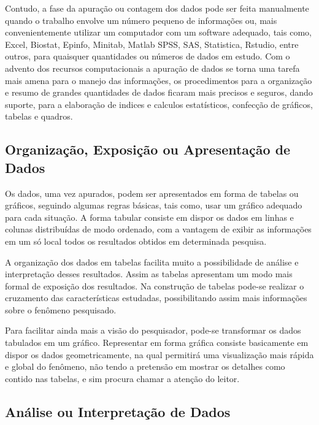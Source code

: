 Contudo, a fase da apuração ou contagem dos dados pode ser feita manualmente quando o trabalho envolve um número pequeno de
informações ou, mais convenientemente utilizar um computador com
um software adequado, tais como, Excel, Biostat, Epinfo, Minitab, Matlab
SPSS, SAS, Statistica, Rstudio, entre outros, para quaisquer quantidades ou números de
dados em estudo. Com o advento dos recursos computacionais a
apuração de dados se torna uma tarefa mais amena para o manejo das
informações, os procedimentos para a organização e resumo de
grandes quantidades de dados ficaram mais precisos e seguros,
dando suporte, para a elaboração de indices e calculos
estatísticos, confecção de gráficos, tabelas e quadros.



\subsection{Organização, Exposição ou Apresentação de Dados}

\inic Os dados, uma vez apurados, podem ser apresentados em forma
de tabelas ou gráficos, seguindo algumas regras básicas,
tais como, usar um gráfico adequado para cada situação. A forma
tabular consiste em dispor os dados em linhas e colunas
distribuídas de modo ordenado, com a vantagem de exibir as
informações em um só local todos os resultados obtidos em
determinada pesquisa. 

\newpage
A organização dos dados em tabelas facilita
muito a possibilidade de análise e interpretação desses
resultados. Assim as tabelas apresentam um modo mais formal de
exposição dos resultados. Na construção de tabelas pode-se
realizar o cruzamento das características estudadas,
possibilitando assim mais informações sobre o fenômeno
pesquisado.\vskip0.3cm

\inic Para facilitar ainda mais a visão do
pesquisador, pode-se transformar os dados
tabulados em um gráfico. Representar em forma
gráfica consiste basicamente em dispor os dados
geometricamente, na qual permitirá uma visualização
mais rápida e global do fenômeno, não tendo a pretensão
em mostrar os detalhes como contido nas tabelas, e sim
procura chamar a atenção do leitor.\vskip0.3cm


\subsection{Análise ou Interpretação de Dados}

